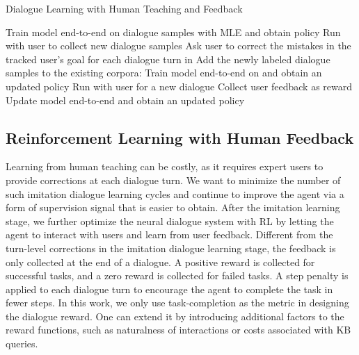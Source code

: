 \documentclass[11pt,a4paper]{article}
\begin{document}
    \begin{algorithm}[t]
    \caption{Dialogue Learning with Human Teaching and Feedback}
    \begin{algorithmic}[1]
    \State Train model end-to-end on dialogue samples  with MLE and obtain policy  
        \State Run  with user to collect new \hspace*{5mm} dialogue samples 
        \State Ask user to correct the mistakes in the \hspace*{5mm} tracked user's goal for each dialogue turn \hspace*{5mm} in 
        \State Add the newly labeled dialogue samples \hspace*{5mm} to the existing corpora: 
        \State Train model end-to-end on  and obtain \hspace*{5mm} an updated policy  
    \EndFor
    	\State Run  with user for a new dialogue
        \State Collect user feedback as reward 
        \State Update model end-to-end and obtain an \hspace*{5mm} updated policy  
    \EndFor
    \end{algorithmic}
    \end{algorithm}

\subsection{Reinforcement Learning with Human Feedback}
    Learning from human teaching can be costly, as it requires expert users to provide corrections at each dialogue turn. We want to minimize the number of such imitation dialogue learning cycles and continue to improve the agent via a form of supervision signal that is easier to obtain. After the imitation learning stage, we further optimize the neural dialogue system with RL by letting the agent to interact with users and learn from user feedback. Different from the turn-level corrections in the imitation dialogue learning stage, the feedback is only collected at the end of a dialogue. A positive reward is collected for successful tasks, and a zero reward is collected for failed tasks. A step penalty is applied to each dialogue turn to encourage the agent to complete the task in fewer steps. In this work, we only use task-completion as the metric in designing the dialogue reward. One can extend it by introducing additional factors to the reward functions, such as naturalness of interactions or costs associated with KB queries. 
    
\end{document}
